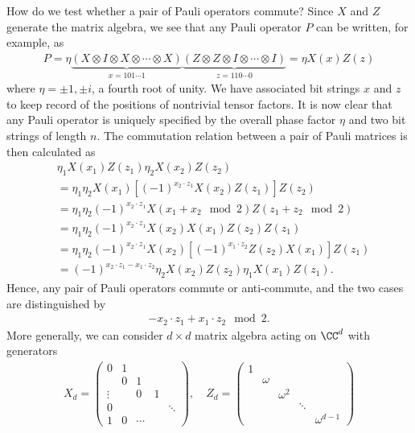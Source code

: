 How do we test whether a pair of Pauli operators commute?
Since $X$ and $Z$ generate the matrix algebra,
we see that any Pauli operator $P$ can be written, for example, as
\begin{align}
 P = \eta 
 \underbrace{(X \otimes I \otimes X \otimes \cdots \otimes X )}_{x = 101\cdots 1}
 \underbrace{(Z \otimes Z \otimes I \otimes \cdots \otimes I )}_{z = 110\cdots 0}
 = \eta X(x) Z(z)
\end{align}
where $\eta = \pm 1 , \pm i$, a fourth root of unity.
We have associated bit strings $x$ and $z$ to keep record of the positions of nontrivial tensor factors.
It is now clear that any Pauli operator is uniquely 
specified by the overall phase factor $\eta$ and two bit strings of length $n$.
The commutation relation between a pair of Pauli matrices is then
calculated as
\begin{align}
&\eta_1 X(x_1) Z(z_1) \eta_2 X(x_2) Z(z_2) \nonumber \\ 
 &= \eta_1 \eta_2 X(x_1)\left[ (-1)^{ x_2 \cdot z_1 } X(x_2) Z(z_1) \right] Z(z_2) \nonumber \\
 &= \eta_1 \eta_2 (-1)^{ x_2 \cdot z_1 } X(x_1 + x_2 \mod 2) Z(z_1+ z_2 \mod 2) \label{eq:bitaddition}\\
 &= \eta_1 \eta_2 (-1)^{ x_2 \cdot z_1 }X(x_2)X(x_1) Z(z_2) Z(z_1)\nonumber \\
 &= \eta_1 \eta_2 (-1)^{ x_2 \cdot z_1 }X(x_2)\left[ (-1)^{x_1 \cdot z_2} Z(z_2) X(x_1) \right] Z(z_1) \nonumber \\
 &= (-1)^{ x_2 \cdot z_1 - x_1 \cdot z_2} \eta_2 X(x_2)Z(z_2) \eta_1 X(x_1)Z(z_1).\label{eq:commuted}
\end{align}
Hence, any pair of Pauli operators commute or anti-commute,
and the two cases are distinguished by 
\begin{align}
 -x_2 \cdot z_1 + x_1 \cdot z_2 \mod 2.
\end{align}
More generally,
we can consider $d \times d$ matrix algebra acting on $\CC^d$ with generators
\begin{align}
 X_d =
 \begin{pmatrix}
  0 & 1 &  &  & \\
    & 0 & 1&  & \\
  \vdots &   & 0&1 & \\
  0  &   &  &  & \ddots \\
  1 & 0 & \cdots & &
 \end{pmatrix}, \quad
Z_d =
\begin{pmatrix}
 1 & & & & \\
 & \omega & & & \\
 & & \omega^2 & &\\
 & & & \ddots & \\
 & & & & \omega^{d-1}
\end{pmatrix}
\label{eq:XZdMatrices}
\end{align}
